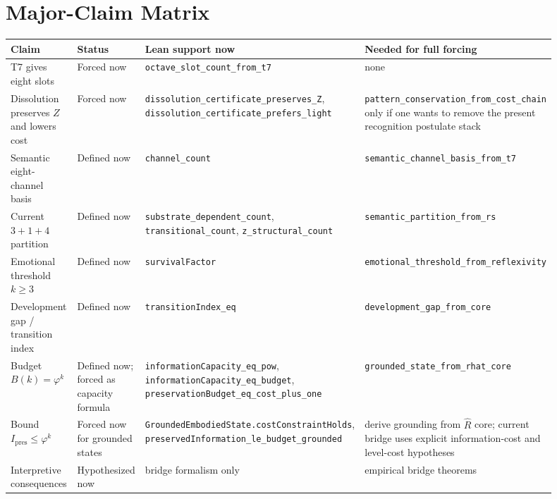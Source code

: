 \documentclass[11pt,a4paper]{article}
\theoremstyle{definition}
\newcommand{\phig}{\varphi}
\newcommand{\Rhat}{\hat{R}}
\newcommand{\Zp}{Z}
\newcommand{\code}[1]{\texttt{\small #1}}
\begin{document}
\appendix
\section{Major-Claim Matrix}
\label{app:matrix}

\begin{center}
\small
\begin{tabular}{p{0.26\linewidth}p{0.16\linewidth}p{0.24\linewidth}p{0.24\linewidth}}
\toprule
\textbf{Claim} & \textbf{Status} & \textbf{Lean support now} & \textbf{Needed for full forcing} \\
\midrule
T7 gives eight slots & Forced now &
\code{octave\_slot\_count\_from\_t7} &
none \\
\addlinespace
Dissolution preserves $\Zp$ and lowers cost & Forced now &
\code{dissolution\_certificate\_preserves\_Z},
\code{dissolution\_certificate\_prefers\_light} &
\code{pattern\_conservation\_from\_cost\_chain} only if one wants to remove the present recognition postulate stack \\
\addlinespace
Semantic eight-channel basis & Defined now &
\code{channel\_count} &
\code{semantic\_channel\_basis\_from\_t7} \\
\addlinespace
Current $3+1+4$ partition & Defined now &
\code{substrate\_dependent\_count},
\code{transitional\_count},
\code{z\_structural\_count} &
\code{semantic\_partition\_from\_rs} \\
\addlinespace
Emotional threshold $k \ge 3$ & Defined now &
\code{survivalFactor} &
\code{emotional\_threshold\_from\_reflexivity} \\
\addlinespace
Development gap / transition index & Defined now &
\code{transitionIndex\_eq} &
\code{development\_gap\_from\_core} \\
\addlinespace
Budget $B(k)=\phig^k$ & Defined now; forced as capacity formula &
\code{informationCapacity\_eq\_pow},
\code{informationCapacity\_eq\_budget},
\code{preservationBudget\_eq\_cost\_plus\_one} &
\code{grounded\_state\_from\_rhat\_core} \\
\addlinespace
Bound $I_{\mathrm{pres}} \le \phig^k$ & Forced now for grounded states &
\code{GroundedEmbodiedState.costConstraintHolds},
\code{preservedInformation\_le\_budget\_grounded} &
derive grounding from $\Rhat$ core; current bridge uses explicit
information-cost and level-cost hypotheses \\
\addlinespace
Interpretive consequences & Hypothesized now &
bridge formalism only &
empirical bridge theorems \\
\bottomrule
\end{tabular}
\end{center}
\end{document}
